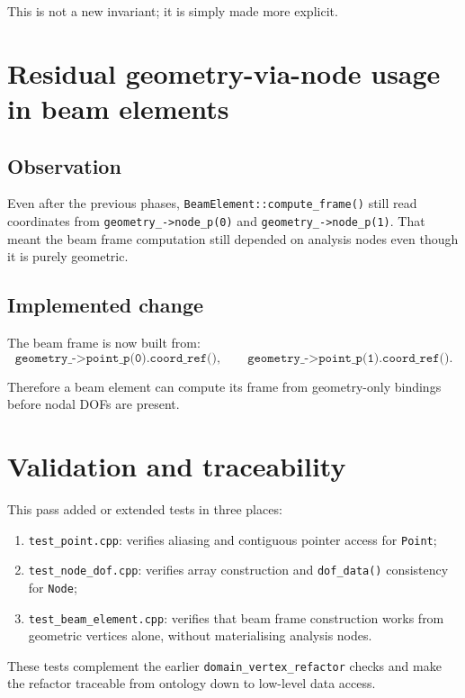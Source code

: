 This is not a new invariant; it is simply made more explicit.

\section{Residual geometry-via-node usage in beam elements}

\subsection{Observation}

Even after the previous phases, \texttt{BeamElement::compute\_frame()} still
read coordinates from \texttt{geometry\_->node\_p(0)} and
\texttt{geometry\_->node\_p(1)}.  That meant the beam frame computation still
depended on analysis nodes even though it is purely geometric.

\subsection{Implemented change}

The beam frame is now built from:
\[
  \texttt{geometry\_->point\_p(0).coord\_ref()},
  \qquad
  \texttt{geometry\_->point\_p(1).coord\_ref()}.
\]

Therefore a beam element can compute its frame from geometry-only bindings
before nodal DOFs are present.

\section{Validation and traceability}

This pass added or extended tests in three places:
\begin{enumerate}[nosep]
  \item \texttt{test\_point.cpp}: verifies aliasing and contiguous pointer
        access for \texttt{Point};
  \item \texttt{test\_node\_dof.cpp}: verifies array construction and
        \texttt{dof\_data()} consistency for \texttt{Node};
  \item \texttt{test\_beam\_element.cpp}: verifies that beam frame construction
        works from geometric vertices alone, without materialising analysis
        nodes.
\end{enumerate}

These tests complement the earlier \texttt{domain\_vertex\_refactor} checks and
make the refactor traceable from ontology down to low-level data access.

